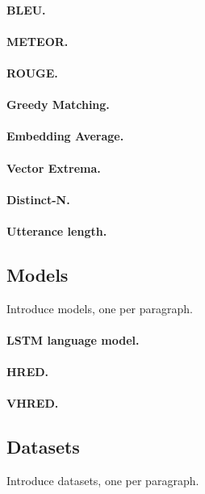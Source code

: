 \documentclass[runningheads]{llncs}
\begin{document}
    \paragraph{BLEU.}
    \paragraph{METEOR.}
    \paragraph{ROUGE.}

    \paragraph{Greedy Matching.}
    \paragraph{Embedding Average.}
    \paragraph{Vector Extrema.}

    \paragraph{Distinct-N.}
    \paragraph{Utterance length.}

    \subsection{Models}
    Introduce models, one per paragraph.
    \paragraph{LSTM language model.}
    \paragraph{HRED.}
    \paragraph{VHRED.}

    \subsection{Datasets}
    Introduce datasets, one per paragraph.
\end{document}
